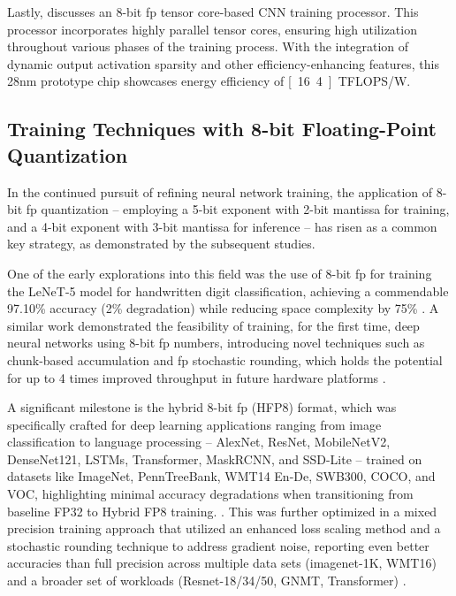 Lastly, \cite{venkataramanaiah202228nm} discusses an 8-bit \gls{fp} tensor core-based CNN training processor. This processor incorporates highly parallel tensor cores, ensuring high utilization throughout various phases of the training process. With the integration of dynamic output activation sparsity and other efficiency-enhancing features, this 28nm prototype chip showcases energy efficiency of \unit[16.4]{TFLOPS/W}.



\subsection{Training Techniques with 8-bit Floating-Point Quantization}
In the continued pursuit of refining neural network training, the application of 8-bit \gls{fp} quantization -- employing a 5-bit exponent with 2-bit mantissa for training, and a 4-bit exponent with 3-bit mantissa for inference -- has risen as a common key strategy, as demonstrated by the subsequent studies.

One of the early explorations into this field was the use of 8-bit \gls{fp} for training the LeNeT-5 model for handwritten digit classification, achieving a commendable 97.10\% accuracy (2\% degradation) while reducing space complexity by 75\% \cite{gallus2018handwritten}. A similar work demonstrated the feasibility of training, for the first time, deep neural networks using 8-bit \gls{fp} numbers, introducing novel techniques such as chunk-based accumulation and \gls{fp} stochastic rounding, which holds the potential for up to 4 times improved throughput in future hardware platforms \cite{wang2018training}.

A significant milestone is the hybrid 8-bit \gls{fp} (HFP8) format, which was specifically crafted for deep learning applications ranging from image classification to language processing -- AlexNet, ResNet, MobileNetV2, DenseNet121, LSTMs, Transformer, MaskRCNN, and SSD-Lite -- trained on datasets like ImageNet, PennTreeBank, WMT14 En-De, SWB300, COCO, and VOC, highlighting minimal accuracy degradations when transitioning from baseline FP32 to Hybrid FP8 training. \cite{sun2019hybrid}. This was further optimized in a mixed precision training approach that utilized an enhanced loss scaling method and a stochastic rounding technique to address gradient noise, reporting even better accuracies than full precision across multiple data sets (imagenet-1K, WMT16) and a broader set of workloads (Resnet-18/34/50, GNMT, Transformer) \cite{mellempudi2019mixed}.

